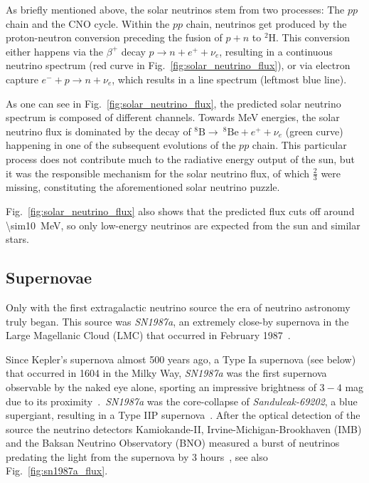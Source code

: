 As briefly mentioned above, the solar neutrinos stem from two processes: The $pp$ chain and the CNO cycle. Within the $pp$ chain, neutrinos get produced by the proton-neutron conversion preceding the fusion of $p+n$ to $^2 \text{H}$. This conversion either happens via the $\beta^+$ decay $p \rightarrow n + e^+ + \nu_e$, resulting in a continuous neutrino spectrum (red curve in Fig.~\ref{fig:solar_neutrino_flux}), or via electron capture $e^- + p \rightarrow n + \nu_e$, which results in a line spectrum (leftmost blue line).

As one can see in Fig.~\ref{fig:solar_neutrino_flux}, the predicted solar neutrino spectrum is composed of different channels. Towards \unit{\mega\eV} energies, the solar neutrino flux is dominated by the decay of $^8\text{B}\rightarrow ~^8\text{Be} + e^+ + \nu_e$ (green curve) happening in one of the subsequent evolutions of the $pp$ chain. This particular process does not contribute much to the radiative energy output of the sun, but it was the responsible mechanism for the solar neutrino flux, of which $\frac{2}{3}$ were missing, constituting the aforementioned solar neutrino puzzle.

Fig.~\ref{fig:solar_neutrino_flux} also shows that the predicted flux cuts off around \SI{\sim10}{\mega\eV}, so only low-energy neutrinos are expected from the sun and similar stars.

\subsection{Supernovae}\label{sne}
Only with the first extragalactic neutrino source the era of neutrino astronomy truly began. This source was \emph{SN1987a}, an extremely close-by supernova in the Large Magellanic Cloud (LMC) that occurred in February 1987~.

Since Kepler's supernova almost 500 years ago, a Type Ia supernova (see below) that occurred in 1604 in the Milky Way, \emph{SN1987a} was the first supernova observable by the naked eye alone, sporting an impressive brightness of $3-4$ mag due to its proximity~.\ \emph{SN1987a} was the core-collapse of \emph{Sanduleak-69202}, a blue supergiant, resulting in a Type IIP supernova~. After the optical detection of the source the neutrino detectors Kamiokande-II, Irvine-Michigan-Brookhaven (IMB) and the Baksan Neutrino Observatory (BNO) measured a burst of neutrinos predating the light from the supernova by 3 hours~, see also Fig.~\ref{fig:sn1987a_flux}.


